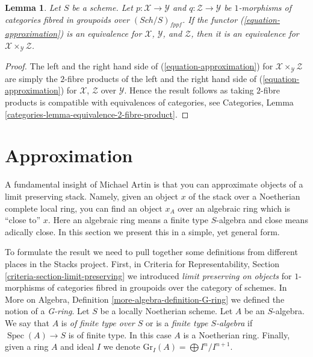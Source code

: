\documentclass{stacks-project}
\theoremstyle{plain}
\newtheorem{lemma}[subsection]{Lemma}
\theoremstyle{definition}
\theoremstyle{remark}
\numberwithin{equation}{subsection}
\def\Spec{\mathop{\mathrm{Spec}}}
\def\Sch{\mathit{Sch}}
\begin{document}
\begin{lemma}
\label{lemma-fibre-product-effective}
Let $S$ be a scheme. Let $p : \mathcal{X} \to \mathcal{Y}$ and
$q : \mathcal{Z} \to \mathcal{Y}$ be $1$-morphisms of categories
fibred in groupoids over $(\Sch/S)_{fppf}$. If the functor
(\ref{equation-approximation}) is an equivalence for 
$\mathcal{X}$, $\mathcal{Y}$, and $\mathcal{Z}$, then it is 
an equivalence for $\mathcal{X} \times_\mathcal{Y} \mathcal{Z}$.
\end{lemma}

\begin{proof}
The left and the right hand side of (\ref{equation-approximation})
for $\mathcal{X} \times_\mathcal{Y} \mathcal{Z}$ are simply the $2$-fibre
products of the left and the right hand side of (\ref{equation-approximation})
for $\mathcal{X}$, $\mathcal{Z}$ over $\mathcal{Y}$.
Hence the result follows as taking $2$-fibre products is compatible
with equivalences of categories, see
Categories, Lemma \ref{categories-lemma-equivalence-2-fibre-product}.
\end{proof}






\section{Approximation}
\label{section-approximation}

\noindent
A fundamental insight of Michael Artin is that you can approximate
objects of a limit preserving stack. Namely, given an object $x$
of the stack over a Noetherian complete local ring, you can find
an object $x_A$ over an algebraic ring which is ``close to'' $x$.
Here an algebraic ring means a finite type $S$-algebra and close
means adically close. In this section we present this in a simple,
yet general form.

\medskip\noindent
To formulate the result we need to pull together some definitions from
different places in the Stacks project. First, in
Criteria for Representability, Section \ref{criteria-section-limit-preserving}
we introduced {\it limit preserving on objects} for $1$-morphisms
of categories fibred in groupoids over the category of schemes.
In More on Algebra, Definition \ref{more-algebra-definition-G-ring}
we defined the notion of a {\it G-ring}. Let $S$ be a locally Noetherian scheme.
Let $A$ be an $S$-algebra. We say that $A$ is {\it of finite type over $S$}
or is a {\it finite type $S$-algebra} if $\Spec(A) \to S$ is of finite type.
In this case $A$ is a Noetherian ring. Finally, given a ring $A$ and ideal
$I$ we denote $\text{Gr}_I(A) = \bigoplus I^n/I^{n + 1}$.
\end{document}
